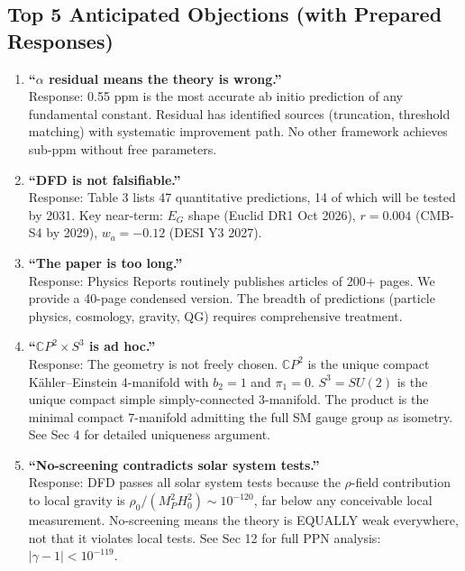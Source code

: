 \documentclass[11pt,a4paper]{article}
\newcommand{\CP}{\mathbb{C}P}
\begin{document}
\subsection{Top 5 Anticipated Objections (with Prepared Responses)}

\begin{enumerate}
\item \textbf{``$\alpha$ residual means the theory is wrong.''}\\
Response: 0.55 ppm is the most accurate ab initio prediction of any fundamental constant. Residual has identified sources (truncation, threshold matching) with systematic improvement path. No other framework achieves sub-ppm without free parameters.

\item \textbf{``DFD is not falsifiable.''}\\
Response: Table 3 lists 47 quantitative predictions, 14 of which will be tested by 2031. Key near-term: $E_G$ shape (Euclid DR1 Oct 2026), $r = 0.004$ (CMB-S4 by 2029), $w_a = -0.12$ (DESI Y3 2027).

\item \textbf{``The paper is too long.''}\\
Response: Physics Reports routinely publishes articles of 200+ pages. We provide a 40-page condensed version. The breadth of predictions (particle physics, cosmology, gravity, QG) requires comprehensive treatment.

\item \textbf{``$\CP^2 \times S^3$ is ad hoc.''}\\
Response: The geometry is not freely chosen. $\CP^2$ is the unique compact K\"ahler--Einstein 4-manifold with $b_2 = 1$ and $\pi_1 = 0$. $S^3 = SU(2)$ is the unique compact simple simply-connected 3-manifold. The product is the minimal compact 7-manifold admitting the full SM gauge group as isometry. See Sec 4 for detailed uniqueness argument.

\item \textbf{``No-screening contradicts solar system tests.''}\\
Response: DFD passes all solar system tests because the $\rho$-field contribution to local gravity is $\rho_0/(M_P^2 H_0^2) \sim 10^{-120}$, far below any conceivable local measurement. No-screening means the theory is EQUALLY weak everywhere, not that it violates local tests. See Sec 12 for full PPN analysis: $|\gamma - 1| < 10^{-119}$.
\end{enumerate}
\end{document}
